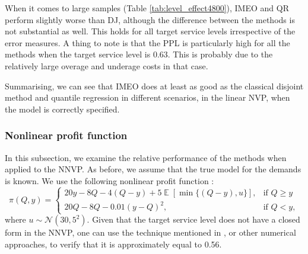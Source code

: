 \documentclass{article}
\DeclareMathOperator{\E}{\mathbb{E}}
\begin{document}
\begin{table}[htb]
\caption{Target service level effect with $s=4800$}
\label{tab:level_effect4800}
\centering
{}
\end{table}

When it comes to large samples (Table \ref{tab:level_effect4800}), IMEO and QR perform slightly worse than DJ, although the difference between the methods is not substantial as well. This holds for all target service levels irrespective of the error measures. A thing to note is that the PPL is particularly high for all the methods when the target service level is 0.63. This is probably due to the relatively large overage and underage costs in that case.

Summarising, we can see that IMEO does at least as good as the classical disjoint method and quantile regression in different scenarios, in the linear NVP, when the model is correctly specified.


\subsubsection{Nonlinear profit function} \label{sub:exp2}

In this subsection, we examine the relative performance of the methods when applied to the NNVP. As before, we assume that the true model for the demands is known. We use the following nonlinear profit function \cite{KK18}:
\[
    \pi(Q,y)=
    \begin{cases}
        20y-8Q-4(Q-y)+5\E[\min \{(Q-y),u\}],& \text{if } Q\geq y\\
        20Q-8Q-0.01(y-Q)^2,& \text{if } Q< y,
    \end{cases}
\]
where $u\sim \mathcal{N}(30,5^2)$. Given that the target service level does not have a closed form in the NNVP, one can use the technique mentioned in \cite{KK18}, or other numerical approaches, to verify that it is approximately equal to 0.56.
\end{document}
